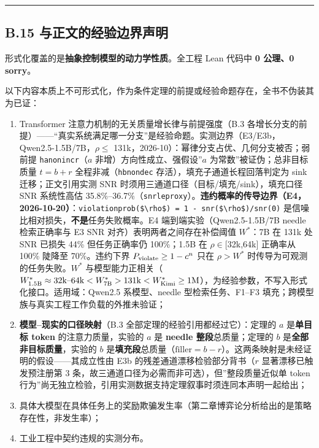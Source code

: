 \documentclass[
]{ctexart}
\providecommand{\tightlist}{%
  \setlength{\itemsep}{0pt}\setlength{\parskip}{0pt}}
\renewcommand{\_}{\discretionary{}{}{\textunderscore}}
\renewcommand{\text}[1]{\textnormal{#1}}
\begin{document}
\begin{center}\rule{0.5\linewidth}{0.5pt}\end{center}

\subsection{B.15
与正文的经验边界声明}\label{b.15-ux4e0eux6b63ux6587ux7684ux7ecfux9a8cux8fb9ux754cux58f0ux660e}

形式化覆盖的是\textbf{抽象控制模型的动力学性质}。全工程 Lean 代码中
\textbf{0 公理、0 sorry}。

以下内容本质上不可形式化，作为条件定理的前提或经验命题存在，全书不伪装其为已证：

\begin{enumerate}
\def\labelenumi{\arabic{enumi}.}
\tightlist
\item
  Transformer 注意力机制的无关质量增长律与前提强度（B.3
  各增长分支的前提）------``真实系统满足哪一分支''是经验命题。实测边界（E3/E3b，Qwen2.5-1.5B/7B，\(\rho\)\(\le\)
  131k，2026-10）：幂律分支占优、几何分支被否；弱前提
  \texttt{ha\_nonincr}（\(a\) 非增）方向性成立、强假设''\(a\)
  为常数''被证伪；总非目标质量 \(t=b+r\) 全程非减（\texttt{hb\_nondec}
  存活），填充子通道长程回落判定为 sink 迁移；正文引用实测 SNR
  时须用三通道口径（目标/填充/sink），填充口径 SNR 系统性高估
  35.8\%--36.7\%（\texttt{snr\_le\_proxy}）。\textbf{违约概率的传导边界（E4，2026-10-20）}：\texttt{violation\_prob(\$\textbackslash{}rho\$)\ =\ 1\ -\ snr(\$\textbackslash{}rho\$)/snr(0)}
  是信噪比相对损失，\textbf{不是}任务失败概率。E4
  端到端实验（Qwen2.5-1.5B/7B needle 检索正确率与 E3 SNR
  对齐）表明两者之间存在补偿阈值 \(W^*\)：7B 在 131k 处 SNR 已损失 44\%
  但任务正确率仍 100\%；1.5B 在 \(\rho\)\(\in\){[}32k,64k{]} 正确率从
  100\% 陡降至 70\%。违约下界 \(P_{\text{violate}} \ge 1 - c^n\) 只在
  \(\rho > W^*\) 时传导为可观测的任务失败。\(W^*\)
  与模型能力正相关（\(W^*_{1.5\text{B}} \approx 32\text{k–64k} < W^*_{7\text{B}} > 131\text{k} < W^*_{\text{Kimi}} \ge 1\text{M}\)），为经验参数，不写入形式化接口。适用域：Qwen2.5
  系模型、needle 型检索任务、F1--F3
  填充；跨模型族与真实工程工作负载的外推未验证；
\item
  \textbf{模型--现实的口径映射}（B.3
  全部定理的经验引用都经过它）：定理的 \(a\) 是\textbf{单目标 token}
  的注意力质量，实验的 \(a\) 是 \textbf{needle 整段}总质量；定理的 \(b\)
  是\textbf{全部非目标质量}，实验的 \(b\)
  是\textbf{填充段}总质量（\(\mathrm{filler}=b-r\)）。这两条映射是未经证明的假设------其成立性由
  E3b 的残差通道漂移检验部分背书（\(r\) 显著漂移已触发预注册第 3
  条，故三通道口径为必需而非可选），但''整段质量近似单 token
  行为''尚无独立检验，引用实测数据支持定理叙事时须连同本声明一起给出；
\item
  具体大模型在具体任务上的奖励欺骗发生率（第二章博弈论分析给出的是策略存在性，非发生率）；
\item
  工业工程中契约违规的实测分布。
\end{enumerate}
\end{document}
